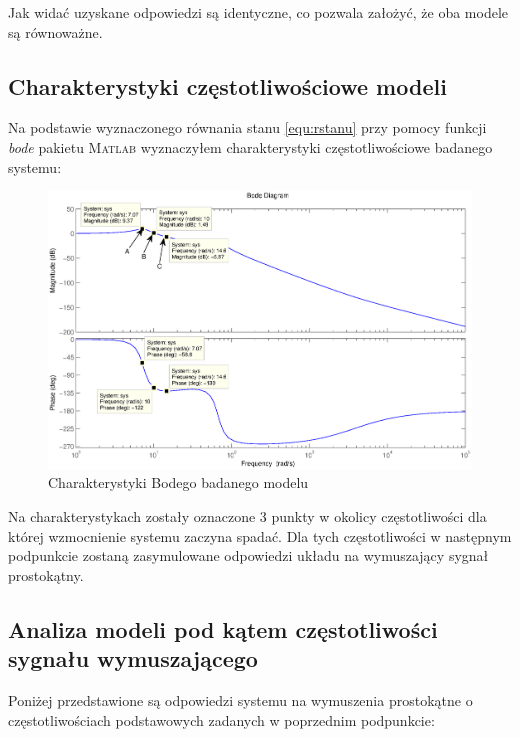 \documentclass[12pt]{article}
\begin{document}
Jak widać uzyskane odpowiedzi są identyczne, co pozwala założyć, że oba modele
są równoważne. 

\newpage

\subsection{Charakterystyki częstotliwościowe modeli}

Na podstawie wyznaczonego równania stanu \eqref{equ:rstanu} przy pomocy funkcji
\textit{bode} pakietu \textsc{Matlab} wyznaczyłem charakterystyki
częstotliwościowe badanego systemu:

\begin{figure}[!htb]
	\begin{center}
		\includegraphics[width=\linewidth]{../res/img/bode.eps}
	\end{center}
	\caption{Charakterystyki Bodego badanego modelu}
	\label{rys:bode}
\end{figure}

Na charakterystykach zostały oznaczone 3 punkty w okolicy częstotliwości dla
której wzmocnienie systemu zaczyna spadać. Dla tych częstotliwości w następnym
podpunkcie zostaną zasymulowane odpowiedzi układu na wymuszający sygnał
prostokątny. 

\newpage

\subsection{Analiza modeli pod kątem częstotliwości sygnału wymuszającego} 

Poniżej przedstawione są odpowiedzi systemu na wymuszenia prostokątne o
częstotliwościach podstawowych zadanych w poprzednim podpunkcie:
 
\end{document}
